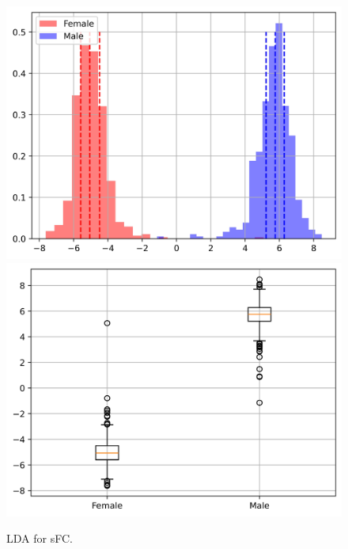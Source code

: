 \documentclass[11pt]{article}
\begin{document}
\begin{figure}[H]
{\begin{minipage}[b]{0.3\textwidth}
            \includegraphics[width=1\textwidth]{../Analysis/LDA/node=50_size=4800_step=4800_rho=0.1/hist_0.jpg}
            \includegraphics[width=1\textwidth]{../Analysis/LDA/node=50_size=4800_step=4800_rho=0.1/box_0.jpg}
        \end{minipage}
    }
    \caption{LDA for sFC.}
\end{figure}
\end{document}
